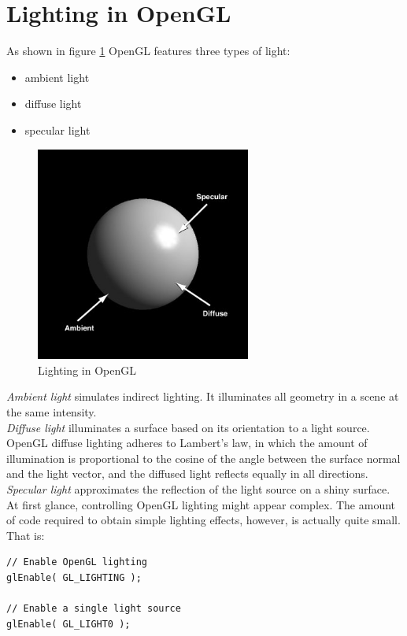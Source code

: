\section{Lighting in OpenGL}
\label{opengl:light}
\lstset{language=C++}

As shown in figure \ref{fig:lighting} OpenGL features three types of light:

\begin{itemize}
  \item ambient light
  \item diffuse light
  \item specular light
\end{itemize}

\begin{figure}[!h]
  \begin{center}
    \includegraphics[width=200pt]{img/light}
    \caption{Lighting in OpenGL}
    \label{fig:lighting}
  \end{center}
\end{figure}

\textit{Ambient light} simulates indirect lighting. It illuminates all 
geometry in a scene at the same intensity.
\\
\textit{Diffuse light} illuminates a surface based on its orientation 
to a light source. OpenGL diffuse lighting adheres to 
Lambert's law, in which the amount of illumination is proportional 
to the cosine of the angle between the surface normal and the 
light vector, and the diffused light reflects equally in 
all directions.
\\
\textit{Specular light} approximates the reflection of the light source on 
a shiny surface.
\\
At first glance, controlling OpenGL lighting might appear complex. 
The amount of code required to obtain simple lighting effects, 
however, is actually quite small. That is:
\\
\begin{lstlisting}[caption={Lighting example}, label={code:lighting}]
// Enable OpenGL lighting
glEnable( GL_LIGHTING );

// Enable a single light source
glEnable( GL_LIGHT0 );
\end{lstlisting}

